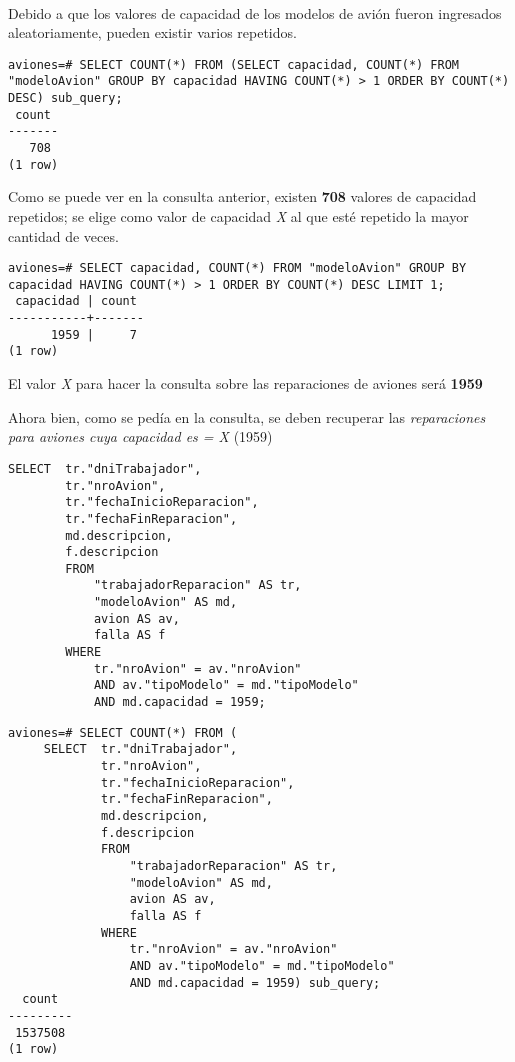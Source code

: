 ~\\

Debido a que los valores de capacidad de los modelos de avión fueron ingresados aleatoriamente, pueden existir varios repetidos.

\vspace*{5mm}
\lstset{style=sql}
\begin{lstlisting}
aviones=# SELECT COUNT(*) FROM (SELECT capacidad, COUNT(*) FROM "modeloAvion" GROUP BY capacidad HAVING COUNT(*) > 1 ORDER BY COUNT(*) DESC) sub_query;
 count 
-------
   708
(1 row)
\end{lstlisting}

Como se puede ver en la consulta anterior, existen \textbf{708} valores de capacidad repetidos; se elige como valor de capacidad \emph{X} al que esté repetido la mayor cantidad de veces.  

\vspace*{5mm}
\lstset{style=sql}
\begin{lstlisting}
aviones=# SELECT capacidad, COUNT(*) FROM "modeloAvion" GROUP BY capacidad HAVING COUNT(*) > 1 ORDER BY COUNT(*) DESC LIMIT 1;
 capacidad | count 
-----------+-------
      1959 |     7
(1 row)
\end{lstlisting}

El valor \emph{X} para hacer la consulta sobre las reparaciones de aviones será \textbf{1959}  


Ahora bien, como se pedía en la consulta, se deben recuperar las \emph{reparaciones para aviones cuya capacidad es = X} (1959) 

\lstset{style=sql}
\begin{lstlisting}
SELECT  tr."dniTrabajador", 
        tr."nroAvion",
        tr."fechaInicioReparacion",
        tr."fechaFinReparacion",
        md.descripcion,
        f.descripcion
        FROM 
            "trabajadorReparacion" AS tr,
            "modeloAvion" AS md,
            avion AS av,
            falla AS f
        WHERE
            tr."nroAvion" = av."nroAvion"
            AND av."tipoModelo" = md."tipoModelo"
            AND md.capacidad = 1959;
\end{lstlisting}

\lstset{style=sql}
\begin{lstlisting}
aviones=# SELECT COUNT(*) FROM (
     SELECT  tr."dniTrabajador", 
             tr."nroAvion",
             tr."fechaInicioReparacion",
             tr."fechaFinReparacion",
             md.descripcion,
             f.descripcion
             FROM 
                 "trabajadorReparacion" AS tr,
                 "modeloAvion" AS md,
                 avion AS av,
                 falla AS f
             WHERE
                 tr."nroAvion" = av."nroAvion"
                 AND av."tipoModelo" = md."tipoModelo"
                 AND md.capacidad = 1959) sub_query;
  count  
---------
 1537508
(1 row)
\end{lstlisting}

